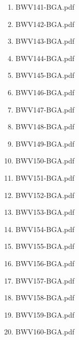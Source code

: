 \documentclass[11pt]{article}
\begin{document}
\begin{enumerate}
\begin{enumerate}
\begin{enumerate}
\item BWV141-BGA.pdf
\label{sec-1-1-1-1-44-6-7-1-162}

\item BWV142-BGA.pdf
\label{sec-1-1-1-1-44-6-7-1-163}

\item BWV143-BGA.pdf
\label{sec-1-1-1-1-44-6-7-1-164}

\item BWV144-BGA.pdf
\label{sec-1-1-1-1-44-6-7-1-165}

\item BWV145-BGA.pdf
\label{sec-1-1-1-1-44-6-7-1-166}

\item BWV146-BGA.pdf
\label{sec-1-1-1-1-44-6-7-1-167}

\item BWV147-BGA.pdf
\label{sec-1-1-1-1-44-6-7-1-168}

\item BWV148-BGA.pdf
\label{sec-1-1-1-1-44-6-7-1-169}

\item BWV149-BGA.pdf
\label{sec-1-1-1-1-44-6-7-1-170}

\item BWV150-BGA.pdf
\label{sec-1-1-1-1-44-6-7-1-171}

\item BWV151-BGA.pdf
\label{sec-1-1-1-1-44-6-7-1-172}

\item BWV152-BGA.pdf
\label{sec-1-1-1-1-44-6-7-1-173}

\item BWV153-BGA.pdf
\label{sec-1-1-1-1-44-6-7-1-174}

\item BWV154-BGA.pdf
\label{sec-1-1-1-1-44-6-7-1-175}

\item BWV155-BGA.pdf
\label{sec-1-1-1-1-44-6-7-1-176}

\item BWV156-BGA.pdf
\label{sec-1-1-1-1-44-6-7-1-177}

\item BWV157-BGA.pdf
\label{sec-1-1-1-1-44-6-7-1-178}

\item BWV158-BGA.pdf
\label{sec-1-1-1-1-44-6-7-1-179}

\item BWV159-BGA.pdf
\label{sec-1-1-1-1-44-6-7-1-180}

\item BWV160-BGA.pdf
\label{sec-1-1-1-1-44-6-7-1-181}


\end{enumerate}
\end{enumerate}
\end{enumerate}
\end{document}
